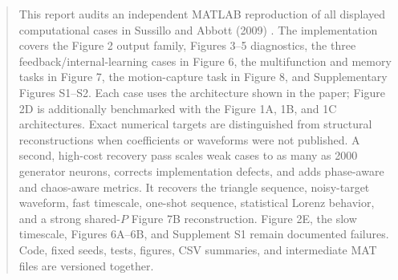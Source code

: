 \maketitle

\begin{abstract}
This report audits an independent MATLAB reproduction of all displayed computational cases in Sussillo and Abbott (2009) \cite{sussillo_generating_2009}. The implementation covers the Figure 2 output family, Figures 3--5 diagnostics, the three feedback/internal-learning cases in Figure 6, the multifunction and memory tasks in Figure 7, the motion-capture task in Figure 8, and Supplementary Figures S1--S2. Each case uses the architecture shown in the paper; Figure 2D is additionally benchmarked with the Figure 1A, 1B, and 1C architectures. Exact numerical targets are distinguished from structural reconstructions when coefficients or waveforms were not published. A second, high-cost recovery pass scales weak cases to as many as 2000 generator neurons, corrects implementation defects, and adds phase-aware and chaos-aware metrics. It recovers the triangle sequence, noisy-target waveform, fast timescale, one-shot sequence, statistical Lorenz behavior, and a strong shared-$P$ Figure 7B reconstruction. Figure 2E, the slow timescale, Figures 6A--6B, and Supplement S1 remain documented failures. Code, fixed seeds, tests, figures, CSV summaries, and intermediate MAT files are versioned together.
\end{abstract}

\newpage
